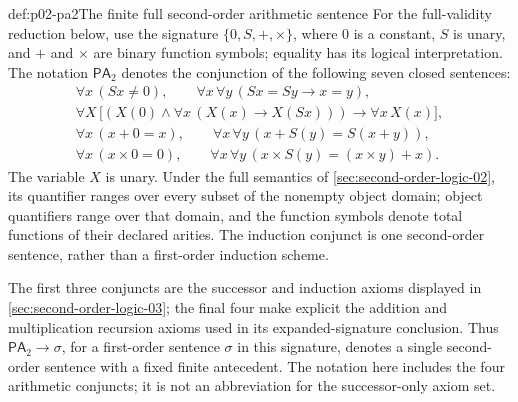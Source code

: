 \begin{hbdefinition}{def:p02-pa2}{The finite full second-order arithmetic sentence}
For the full-validity reduction below, use the signature
\(\{0,S,+,\times\}\), where \(0\) is a constant, \(S\) is unary,
and \(+\) and \(\times\) are binary function symbols; equality has its
logical interpretation.  The notation \(\mathsf{PA}_2\) denotes the
conjunction of the following seven closed sentences:
\[
\begin{gathered}
  \forall x\,(Sx\ne0),
  \qquad
  \forall x\,\forall y\,(Sx=Sy\to x=y),\\
  \forall X\,
    \bigl[(X(0)\land\forall x\,(X(x)\to X(Sx)))
           \to\forall x\,X(x)\bigr],\\
  \forall x\,(x+0=x),
  \qquad
  \forall x\,\forall y\,(x+S(y)=S(x+y)),\\
  \forall x\,(x\times0=0),
  \qquad
  \forall x\,\forall y\,
    (x\times S(y)=(x\times y)+x).
\end{gathered}
\]
The variable \(X\) is unary.  Under the full semantics of
\cref{sec:second-order-logic-02}, its quantifier ranges over every
subset of the nonempty object domain; object quantifiers range over that
domain, and the function symbols denote total functions of their declared
arities.  The induction conjunct is one second-order sentence, rather than
a first-order induction scheme.

The first three conjuncts are the successor and induction axioms displayed
in \cref{sec:second-order-logic-03}; the final four make explicit the
addition and multiplication recursion axioms used in its expanded-signature
conclusion.  Thus \(\mathsf{PA}_2\to\sigma\), for a first-order sentence
\(\sigma\) in this signature, denotes a single second-order sentence with
a fixed finite antecedent.  The notation here includes the four arithmetic
conjuncts; it is not an abbreviation for the successor-only axiom set.
\end{hbdefinition}
